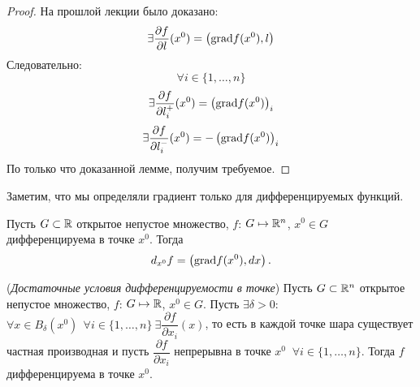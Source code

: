 \begin{proof}
    На прошлой лекции было доказано:
    $$\exists \dfrac{\partial f}{\partial l} (x^0) = \left( \textup{grad} f(x^0), l\right)$$
    Следовательно:
    $$\forall i \in \{1, \ldots, n\}$$
    $$\exists \dfrac{\partial f}{\partial l_i^{+}} (x^0) = \left( \textup{grad} f(x^0) \right)_i$$
    $$\exists \dfrac{\partial f}{\partial l_i^{-}} (x^0) = -\left( \textup{grad} f(x^0) \right)_i$$
    По только что доказанной лемме, получим требуемое.
\end{proof}

\begin{note}
    Заметим, что мы определяли градиент только для дифференцируемых функций.
\end{note}

\begin{corollary}
    Пусть $G \subset \mathbb{R}$ открытое непустое множество, $f$: $G \mapsto \mathbb{R}^{n}$, $x^{0} \in G$ дифференцируема в точке $x^0.$ Тогда 
    $$d_{x^0}f = \left(\textup{grad}f(x^0), dx \right).$$
\end{corollary}

\begin{theorem}
    (\textit{Достаточные условия дифференцируемости в точке})  Пусть $G \subset \mathbb{R}^{n}$ открытое непустое множество, $f$: $G \mapsto \mathbb{R}$, $x^{0} \in G.$ Пусть $\exists \delta > 0$: $\forall x \in B_{\delta}(x^0) \ \ \forall i \in \{1, \ldots, n\} \ \exists \dfrac{\partial f}{\partial x_i} (x)$, то есть в каждой точке шара существует частная производная и пусть $\dfrac{\partial f}{\partial x_i}$ непрерывна в точке $x^0$ $ \ \forall i \in \{1, \ldots, n\}.$ Тогда $f$ дифференцируема в точке $x^{0}$.
\end{theorem}

